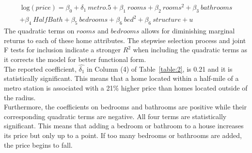 \documentclass[12pt]{report}
\newcommand\tab[1][.50cm]{\hspace*{#1}}
\begin{document}
\begin{align}
\ \text{log}(price) = \beta_0 +\delta_1\ metro.5  + \beta_1 \ rooms + \beta_2\ rooms^2 + \beta_3\ bathrooms \nonumber \\ + \beta_4\ HalfBath + \beta_5\ bedrooms + \beta_6\ bed^2 + \beta_6\ structure + u \ 
\label{eqn:5}
\end{align}
The quadratic terms on $rooms$ and $bedrooms$ allows for diminishing marginal returns to each of these home attributes. The stepwise selection process and joint F tests for inclusion indicate a stronger $R^2$ when including the quadratic terms as it corrects the model for better functional form. \\
\tab The reported coefficient, $\hat{\delta_1}$  in Column (4) of Table~\ref{table:2}, is 0.21 and it is statistically significant. This means that a home located within a half-mile of a metro station is associated with a 21\% higher price than homes located outside of the radius. \\
\tab Furthermore, the coefficients on bedrooms and bathrooms are positive while their corresponding quadratic terms are negative. All four terms are statistically significant. This means that adding a bedroom or bathroom to a house increases its price but only up to a point. If too many bedrooms or bathrooms are added, the price begins to fall. 
\end{document}
